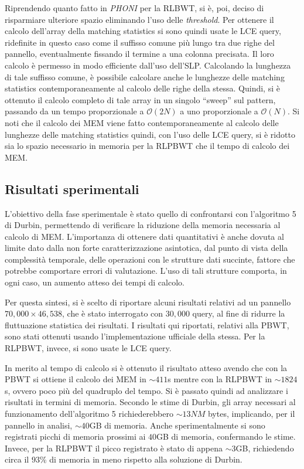 \documentclass[a4paper,11pt, oneside,italian]{article}
\begin{document}
Riprendendo quanto fatto in \textit{PHONI} per
la RLBWT, si è, poi, deciso di risparmiare ulteriore spazio eliminando
l'uso delle \textit{threshold}. Per ottenere il calcolo dell'array della
matching statistics si sono quindi usate le LCE query, ridefinite in questo caso
come il suffisso comune più lungo tra due righe del pannello, eventualmente
fissando il termine a una colonna precisata. Il loro calcolo è permesso
in modo efficiente dall'uso dell'SLP. Calcolando la
lunghezza di tale suffisso comune, è possibile calcolare anche le
lunghezze delle matching statistics contemporaneamente al calcolo delle
righe della stessa. Quindi, si è ottenuto il calcolo completo di tale array in
un singolo ``sweep'' sul pattern, passando da un tempo proporzionale a
$\mathcal{O}(2N)$ a uno proporzionale a 
$\mathcal{O}(N)$. Si noti che il calcolo dei MEM viene fatto contemporaneamente
al calcolo delle lunghezze delle matching statistics quindi, con l'uso delle LCE
query, si è ridotto sia lo spazio necessario in memoria per la RLPBWT che il
tempo di calcolo dei MEM.

\subsection*{Risultati sperimentali}
L'obiettivo della fase sperimentale è stato quello di confrontarsi con
l'algoritmo 5 di Durbin, permettendo di verificare la
riduzione della memoria necessaria al calcolo di MEM. L'importanza di ottenere
dati quantitativi è anche dovuta al limite 
dato dalla non forte caratterizzazione asintotica, dal punto di vista della
complessità temporale, delle operazioni con le strutture dati succinte, fattore
che potrebbe comportare errori di 
valutazione. L'uso di tali strutture comporta, in ogni caso, un aumento atteso
dei tempi di calcolo.

Per questa sintesi, si è scelto di riportare alcuni risultati relativi ad un
pannello $70,000 \times 46,538$, che è stato interrogato con $30,000$ query, al
fine di ridurre la fluttuazione statistica dei risultati.
I risultati qui riportati, relativi alla PBWT, sono stati ottenuti usando
l'implementazione ufficiale della stessa. Per la RLPBWT, invece, si sono usate
le LCE query. 

In merito al tempo di calcolo si è ottenuto il risultato atteso avendo che con
la PBWT si ottiene il calcolo dei MEM in $\sim 411$s 
mentre con la RLPBWT in $\sim 1824$s, ovvero poco più del quadruplo del tempo.
Si è passato quindi ad analizzare i risultati in termini di memoria. Secondo le
stime di Durbin, gli array necessari al funzionamento dell'algoritmo 5
richiederebbero $\sim 13NM$ bytes, implicando, per il pannello in analisi, $\sim
40$GB di memoria. Anche sperimentalmente si sono registrati 
picchi di memoria prossimi ai $40$GB di memoria, confermando le stime. Invece,
per la RLPBWT il picco registrato è stato di appena $\sim 3$GB, richiedendo
circa il $93$\% di memoria in meno rispetto alla soluzione di Durbin.
\end{document}
